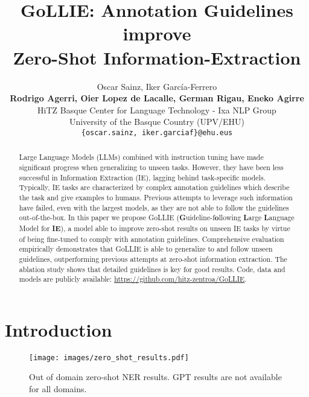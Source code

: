 \documentclass{article} \usepackage{iclr2024_conference,times}
\title{\scalerel*{\texttt{[image: logo/GoLLIE.pdf]}}{\textrm{\textbigcircle}} GoLLIE: Annotation Guidelines improve\\ Zero-Shot Information-Extraction}
\author{Oscar Sainz\nolinkthanks{Equal contribution}\:, \: Iker García-Ferrero\nolinkmark  \\
\textbf{Rodrigo Agerri, \: Oier Lopez de Lacalle, \: German Rigau, \: Eneko Agirre} \\
HiTZ Basque Center for Language Technology - Ixa NLP Group \\
University of the Basque Country (UPV/EHU)\\
\texttt{\{oscar.sainz, iker.garciaf\}@ehu.eus} \\
}
\begin{document}
\maketitle

\begin{abstract}
Large Language Models (LLMs) combined with instruction tuning have made significant progress when generalizing to unseen tasks. However, they have been less successful in Information Extraction (IE), lagging behind task-specific models. Typically, IE tasks are characterized by complex annotation guidelines which describe the task and give examples to humans. 
Previous attempts to leverage such information have failed, even with the largest models, as they are not able to follow the guidelines out-of-the-box. 
In this paper we propose GoLLIE (\textbf{G}uideline-f\textbf{o}llowing \textbf{L}arge \textbf{L}anguage Model for \textbf{IE}), a model able to improve zero-shot results on unseen IE tasks by virtue of being fine-tuned to comply with  annotation guidelines.
Comprehensive evaluation empirically demonstrates that GoLLIE is able to generalize to and follow unseen guidelines, outperforming previous attempts at zero-shot information extraction. The ablation study shows that detailed guidelines is key for good results. Code, data and models are publicly available: \url{https://github.com/hitz-zentroa/GoLLIE}. 

\end{abstract}


























\section{Introduction}
\begin{figure}[b]
    \centering
    \texttt{[image: images/zero\_shot\_results.pdf]}
    \caption{Out of domain zero-shot NER results. GPT results are not  available for all domains.}
    \label{fig:zero-shot-results}
\end{figure}
\end{document}
